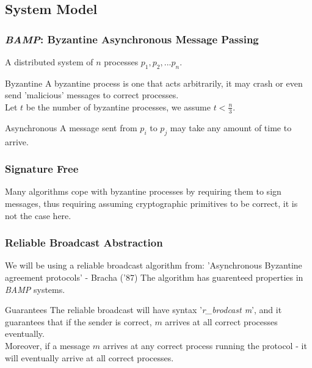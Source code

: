 \subsection{System Model}
\begin{frame}
    \frametitle{\emph{BAMP}: Byzantine Asynchronous Message Passing}
    A distributed system of $n$ processes $p_1, p_2, ... p_n$.
    \begin{block}{Byzantine}
        A byzantine process is one that acts arbitrarily, it may crash or even
        send 'malicious' messages to correct processes.\\
        Let $t$ be the number of byzantine processes, we assume $t<\frac{n}{3}$.
    \end{block}
    \begin{block}{Asynchronous}
        A message sent from $p_i$ to $p_j$ may take any amount of time to arrive.
    \end{block}
\end{frame}

\begin{frame}
    \frametitle{Signature Free}
    Many algorithms cope with byzantine processes by requiring them to sign messages,
    thus requiring assuming cryptographic primitives to be correct, it is not the case here.
\end{frame}

\begin{frame}
    \frametitle{Reliable Broadcast Abstraction}
    We will be using a reliable broadcast algorithm from:
    'Asynchronous Byzantine agreement protocols' - Bracha ('87)
    The algorithm has guarenteed properties in \emph{BAMP} systems.
    \begin{block}{Guarantees}
        The reliable broadcast will have syntax '\emph{r\_brodcast m}',
        and it guarantees that if the sender
        is correct, $m$ arrives at all correct processes eventually.\\
        Moreover, if a message $m$ arrives at any correct process running the protocol -
        it will eventually arrive at all correct processes.
    \end{block}
\end{frame}

